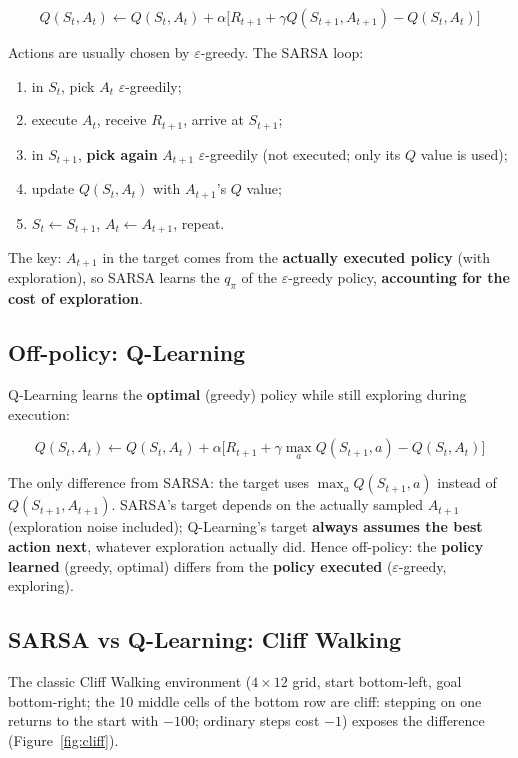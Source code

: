 \documentclass{article}
\begin{document}
\[
\boxed{Q(S_t,A_t) \leftarrow Q(S_t,A_t) + \alpha\bigl[R_{t+1} + \gamma Q(S_{t+1},A_{t+1}) - Q(S_t,A_t)\bigr]}
\]

Actions are usually chosen by $\varepsilon$-greedy. The SARSA loop:
\begin{enumerate}
  \item in $S_t$, pick $A_t$ $\varepsilon$-greedily;
  \item execute $A_t$, receive $R_{t+1}$, arrive at $S_{t+1}$;
  \item in $S_{t+1}$, \textbf{pick again} $A_{t+1}$ $\varepsilon$-greedily (not executed; only its $Q$ value is used);
  \item update $Q(S_t,A_t)$ with $A_{t+1}$'s $Q$ value;
  \item $S_t \leftarrow S_{t+1}$, $A_t \leftarrow A_{t+1}$, repeat.
\end{enumerate}

The key: $A_{t+1}$ in the target comes from the \textbf{actually executed policy} (with exploration), so SARSA learns the $q_\pi$ of the $\varepsilon$-greedy policy, \textbf{accounting for the cost of exploration}.

\subsection*{Off-policy: Q-Learning}

Q-Learning learns the \textbf{optimal} (greedy) policy while still exploring during execution:

\[
\boxed{Q(S_t,A_t) \leftarrow Q(S_t,A_t) + \alpha\bigl[R_{t+1} + \gamma \max_a Q(S_{t+1},a) - Q(S_t,A_t)\bigr]}
\]

The only difference from SARSA: the target uses $\max_a Q(S_{t+1},a)$ instead of $Q(S_{t+1},A_{t+1})$. SARSA's target depends on the actually sampled $A_{t+1}$ (exploration noise included); Q-Learning's target \textbf{always assumes the best action next}, whatever exploration actually did. Hence off-policy: the \textbf{policy learned} (greedy, optimal) differs from the \textbf{policy executed} ($\varepsilon$-greedy, exploring).

\subsection*{SARSA vs Q-Learning: Cliff Walking}

The classic Cliff Walking environment ($4\times12$ grid, start bottom-left, goal bottom-right; the 10 middle cells of the bottom row are cliff: stepping on one returns to the start with $-100$; ordinary steps cost $-1$) exposes the difference (Figure~\ref{fig:cliff}).
\end{document}
